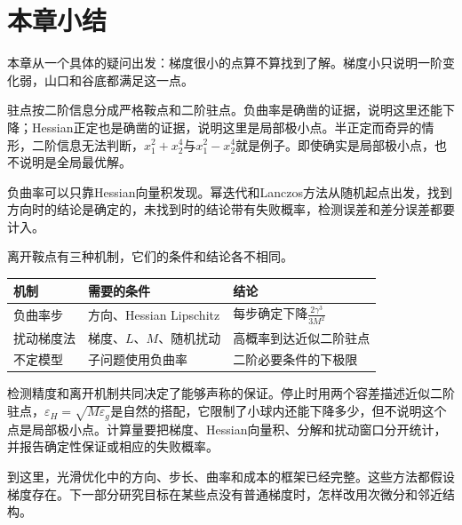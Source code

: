 \section{本章小结}
\label{sec:saddle-summary}

本章从一个具体的疑问出发：梯度很小的点算不算找到了解。梯度小只说明一阶变化弱，山口和谷底都满足这一点。

驻点按二阶信息分成严格鞍点和二阶驻点。负曲率是确凿的证据，说明这里还能下降；Hessian正定也是确凿的证据，说明这里是局部极小点。半正定而奇异的情形，二阶信息无法判断，$x_1^2+x_2^4$与$x_1^2-x_2^4$就是例子。即使确实是局部极小点，也不说明是全局最优解。

负曲率可以只靠Hessian向量积发现。幂迭代和Lanczos方法从随机起点出发，找到方向时的结论是确定的，未找到时的结论带有失败概率，检测误差和差分误差都要计入。

离开鞍点有三种机制，它们的条件和结论各不相同。

\begin{BookInlineTable}
  \centering
  \begin{tabular}{@{}lll@{}}
    \toprule
    机制 & 需要的条件 & 结论\\
    \midrule
    负曲率步 & 方向、Hessian Lipschitz & 每步确定下降$\frac{2\gamma^3}{3M^2}$\\
    扰动梯度法 & 梯度、$L$、$M$、随机扰动 & 高概率到达近似二阶驻点\\
    不定模型 & 子问题使用负曲率 & 二阶必要条件的下极限\\
    \bottomrule
  \end{tabular}
  \caption{三种离开鞍点的机制。修正Hessian只为得到下降方向，它的保证停留在一阶。}
  \label{tab:saddle-summary}
\end{BookInlineTable}

检测精度和离开机制共同决定了能够声称的保证。停止时用两个容差描述近似二阶驻点，$\varepsilon_H=\sqrt{M\varepsilon_g}$是自然的搭配，它限制了小球内还能下降多少，但不说明这个点是局部极小点。计算量要把梯度、Hessian向量积、分解和扰动窗口分开统计，并报告确定性保证或相应的失败概率。

到这里，光滑优化中的方向、步长、曲率和成本的框架已经完整。这些方法都假设梯度存在。下一部分研究目标在某些点没有普通梯度时，怎样改用次微分和邻近结构。
